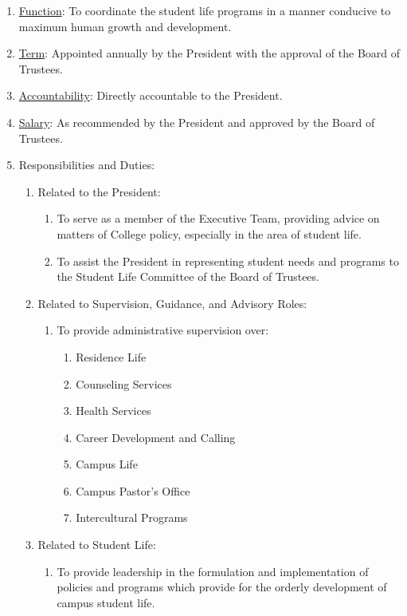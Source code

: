 					\begin{enumerate}
						\item{\underline{Function}: To coordinate the student life programs in a manner conducive to maximum human growth and development.}
						\item{\underline{Term}: Appointed annually by the President with the approval of the Board of Trustees.}
						\item{\underline{Accountability}: Directly accountable to the President.}
						\item{\underline{Salary}: As recommended by the President and approved by the Board of Trustees.}
						\item{Responsibilities and Duties:
							\begin{enumerate}
								\item{Related to the President:
									\begin{enumerate}
										\item{To serve as a member of the Executive Team, providing advice on matters of College policy, especially in the area of student life.}
										\item{To assist the President in representing student needs and programs to the Student Life Committee of the Board of Trustees.}
									\end{enumerate}
								}
								\item{Related to Supervision, Guidance, and Advisory Roles:
									\begin{enumerate}
										\item{To provide administrative supervision over:
											\begin{enumerate}
												\item{Residence Life}
												\item{Counseling Services}
												\item{Health Services}
												\item{Career Development and Calling}
												\item{Campus Life}
												\item{Campus Pastor's Office}
												\item{Intercultural Programs}
											\end{enumerate}
										}
									\end{enumerate}
								}
								\item{Related to Student Life:
									\begin{enumerate}
										\item{To provide leadership in the formulation and implementation of policies and programs which provide for the orderly development of campus student life.}

\end{enumerate}}
\end{enumerate}}
\end{enumerate}
